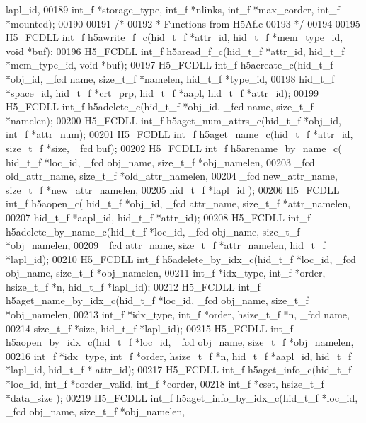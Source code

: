\begin{DoxyCode}
      lapl\_id,
00189                       int\_f *storage\_type, int\_f *nlinks, int\_f *max\_corder, int\_f *mounted);
00190 
00191 \textcolor{comment}{/*}
00192 \textcolor{comment}{ * Functions from H5Af.c}
00193 \textcolor{comment}{ */}
00194 
00195 H5\_FCDLL int\_f h5awrite\_f\_c(hid\_t\_f *attr\_id, hid\_t\_f *mem\_type\_id, \textcolor{keywordtype}{void} *buf);
00196 H5\_FCDLL int\_f h5aread\_f\_c(hid\_t\_f *attr\_id, hid\_t\_f *mem\_type\_id, \textcolor{keywordtype}{void} *buf);
00197 H5\_FCDLL int\_f h5acreate\_c(hid\_t\_f *obj\_id, \_fcd name, size\_t\_f *namelen, hid\_t\_f *type\_id,
00198                         hid\_t\_f *space\_id, hid\_t\_f *crt\_prp, hid\_t\_f *aapl, hid\_t\_f *attr\_id);
00199 H5\_FCDLL int\_f h5adelete\_c(hid\_t\_f *obj\_id, \_fcd name, size\_t\_f *namelen);
00200 H5\_FCDLL int\_f h5aget\_num\_attrs\_c(hid\_t\_f *obj\_id, int\_f *attr\_num);
00201 H5\_FCDLL int\_f h5aget\_name\_c(hid\_t\_f *attr\_id, size\_t\_f *size, \_fcd buf);
00202 H5\_FCDLL int\_f h5arename\_by\_name\_c( hid\_t\_f *loc\_id, \_fcd obj\_name, size\_t\_f *obj\_namelen,
00203                       \_fcd old\_attr\_name, size\_t\_f *old\_attr\_namelen,
00204                       \_fcd new\_attr\_name, size\_t\_f *new\_attr\_namelen,
00205                       hid\_t\_f *lapl\_id );
00206 H5\_FCDLL int\_f h5aopen\_c( hid\_t\_f *obj\_id, \_fcd attr\_name, size\_t\_f *attr\_namelen,
00207                 hid\_t\_f *aapl\_id, hid\_t\_f *attr\_id);
00208 H5\_FCDLL int\_f h5adelete\_by\_name\_c(hid\_t\_f *loc\_id, \_fcd obj\_name, size\_t\_f *obj\_namelen,
00209                      \_fcd attr\_name, size\_t\_f *attr\_namelen, hid\_t\_f *lapl\_id);
00210 H5\_FCDLL int\_f h5adelete\_by\_idx\_c(hid\_t\_f *loc\_id, \_fcd obj\_name, size\_t\_f *obj\_namelen,
00211                     int\_f *idx\_type, int\_f *order, hsize\_t\_f *n, hid\_t\_f *lapl\_id);
00212 H5\_FCDLL int\_f h5aget\_name\_by\_idx\_c(hid\_t\_f *loc\_id, \_fcd obj\_name, size\_t\_f *obj\_namelen,
00213                       int\_f *idx\_type, int\_f *order, hsize\_t\_f *n, \_fcd name,
00214                       size\_t\_f *size, hid\_t\_f *lapl\_id);
00215 H5\_FCDLL int\_f h5aopen\_by\_idx\_c(hid\_t\_f *loc\_id, \_fcd obj\_name, size\_t\_f *obj\_namelen,
00216              int\_f *idx\_type, int\_f *order, hsize\_t\_f *n, hid\_t\_f *aapl\_id, hid\_t\_f *lapl\_id, hid\_t\_f *
      attr\_id);
00217 H5\_FCDLL int\_f h5aget\_info\_c(hid\_t\_f *loc\_id, int\_f *corder\_valid, int\_f *corder,
00218                    int\_f *cset, hsize\_t\_f *data\_size );
00219 H5\_FCDLL int\_f h5aget\_info\_by\_idx\_c(hid\_t\_f *loc\_id, \_fcd obj\_name, size\_t\_f *obj\_namelen,

\end{DoxyCode}
